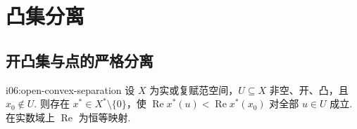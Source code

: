 \section{凸集分离}\label{sec:i06-convex-separation}

\subsection{开凸集与点的严格分离}

\begin{FATheorem}[B][开凸集分离]{i06:open-convex-separation}
设 \(\displaystyle X\) 为实或复赋范空间，\(\displaystyle U\subseteq X\) 非空、开、凸，且 \(\displaystyle x_0\notin U\). 则存在 \(\displaystyle x^*\in X^*\setminus\{0\}\)，使 \(\displaystyle \operatorname{Re}x^*(u) < \operatorname{Re}x^*(x_0)\)
对全部 \(\displaystyle u\in U\) 成立. 在实数域上 \(\displaystyle \operatorname{Re}\) 为恒等映射.
\end{FATheorem}

